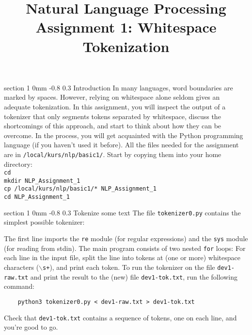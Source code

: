 \documentclass[11pt]{article}
\title{{\LARGE Natural Language Processing}\\[1.5mm]{\large Assignment 1: Whitespace Tokenization}}
\author{}
\date{} %
\makeatletter
\newcommand{\newsec}[2]{\section{#1}\label{sec:#2}\noindent}
\renewcommand{\section}{\@startsection
{section}%
{1}%
{0mm}%
{-0.8\baselineskip}%
{0.3\baselineskip}%
{\bfseries\large}}%
\makeatother
\begin{document}
 

\maketitle
\vspace{-2mm} \newsec{Introduction}{intro}%
In many languages, word boundaries are marked by spaces. However,
relying on whitespace alone seldom gives an adequate tokenization. In
this assignment, you will inspect the output of a tokenizer that only
segments tokens separated by whitespace, discuss the shortcomings of
this approach, and start to think about how they can be overcome. In
the process, you will get acquainted with the Python programming
language (if you haven't used it before).  All the files needed for
the assignment are in {\tt /local/kurs/nlp/basic1/}. Start by copying
them into your home directory:\\
{\tt cd}\\
{\tt mkdir NLP\_Assignment\_1}\\
{\tt cp /local/kurs/nlp/basic1/* NLP\_Assignment\_1}\\
{\tt cd NLP\_Assignment\_1}

\newsec{Tokenize some text}{tokenize}%
The file {\tt tokenizer0.py} contains the simplest possible tokenizer:
\begin{center}
\fbox{

}
\end{center}
The first line imports the {\tt re} module (for regular expressions)
and the {\tt sys} module (for reading from stdin). The main program
consists of two nested {\tt for} loops: For each line in the input
file, split the line into tokens at (one or more) whitespace
characters ({\tt {$\backslash$}s+}), and print each token.  To run the
tokenizer on the file {\tt dev1-raw.txt} and print the result to the
(new) file {\tt dev1-tok.txt}, run the following command:
\begin{verbatim}
    python3 tokenizer0.py < dev1-raw.txt > dev1-tok.txt
\end{verbatim}
Check that {\tt dev1-tok.txt} contains a sequence of tokens, one on
each line, and you're good to go.
\end{document}
